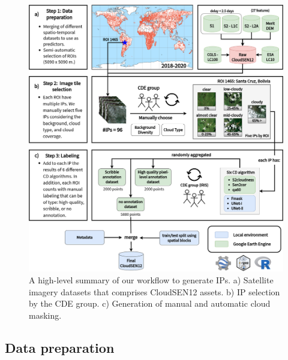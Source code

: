 \documentclass[a4paper, nobind]{templates/cdethesis}
\begin{document}
\begin{figure}[!h]
    \centering
    \includegraphics[width=0.98\linewidth]{figures/chapter01/figure03.png}
    \caption{A high-level summary of our workflow to generate IPs. a) Satellite imagery datasets that comprises CloudSEN12 assets. b) IP selection by the CDE group. c) Generation of manual and automatic cloud masking.}
    \label{fig:figure03}
\end{figure}

\hypertarget{data-preparation}{%
\subsection{Data preparation}\label{data-preparation}}
\end{document}
